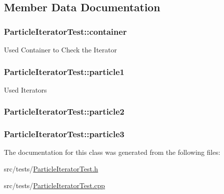 \subsection{Member Data Documentation}
\hypertarget{classParticleIteratorTest_aed0486f4f7d7eb1cb9d0e156fc5d21c0}{
\subsubsection[{container}]{ Particle\-Iterator\-Test\-::container\hspace{0.3cm}{\ttfamily [private]}}}\label{classParticleIteratorTest_aed0486f4f7d7eb1cb9d0e156fc5d21c0}
Used Container to Check the Iterator \hypertarget{classParticleIteratorTest_a2a0c516ec5ead4037c6eb5f0de0816cc}{
\subsubsection[{particle1}]{ Particle\-Iterator\-Test\-::particle1\hspace{0.3cm}{\ttfamily [private]}}}\label{classParticleIteratorTest_a2a0c516ec5ead4037c6eb5f0de0816cc}
Used Iterators \hypertarget{classParticleIteratorTest_afb92dd60b1496e393a3c11563c4d59be}{
\subsubsection[{particle2}]{ Particle\-Iterator\-Test\-::particle2\hspace{0.3cm}{\ttfamily [private]}}}\label{classParticleIteratorTest_afb92dd60b1496e393a3c11563c4d59be}
\hypertarget{classParticleIteratorTest_ae8a159171f6e6825c4eacd2a31b0d291}{
\subsubsection[{particle3}]{ Particle\-Iterator\-Test\-::particle3\hspace{0.3cm}{\ttfamily [private]}}}\label{classParticleIteratorTest_ae8a159171f6e6825c4eacd2a31b0d291}


The documentation for this class was generated from the following files\-:\begin{DoxyCompactItemize}
\item 
src/tests/\hyperlink{ParticleIteratorTest_8h}{Particle\-Iterator\-Test.\-h}\item 
src/tests/\hyperlink{ParticleIteratorTest_8cpp}{Particle\-Iterator\-Test.\-cpp}\end{DoxyCompactItemize}
